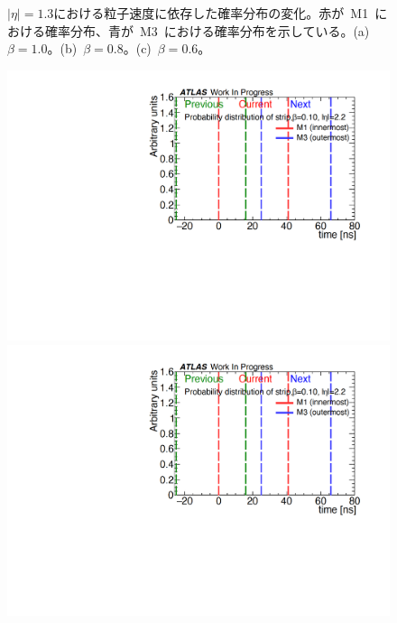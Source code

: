 \begin{figure}[tbp]
\begin{minipage}{0.33\hsize}
    \subcaption{}
    \end{minipage}
    \caption[$|\eta|=1.3$における粒子速度に依存した確率分布の変化]{$|\eta|=1.3$における粒子速度に依存した確率分布の変化。赤が~M1~における確率分布、青が~M3~における確率分布を示している。(a)~$\beta=1.0$。(b)~$\beta=0.8$。(c)~$\beta=0.6$。}\label{fig:recbeta}
\end{figure}

\begin{figure}[tbp]
    \begin{minipage}{0.33\hsize}
    \centering   
    \includegraphics[width=\textwidth,page=11]{img/rec/rec_e2.2_s.pdf}
    \subcaption{}
    \end{minipage}
    \begin{minipage}{0.33\hsize}
    \centering   
    \includegraphics[width=\textwidth,page=9]{img/rec/rec_e2.2_s.pdf}

\end{minipage}
\end{figure}

